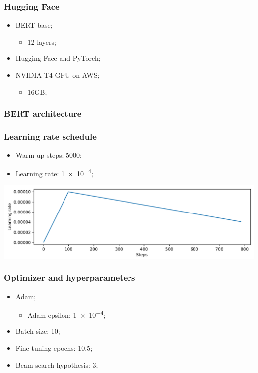 \documentclass{beamer}
\begin{document}
\begin{frame}
  \frametitle{Hugging Face}

  \begin{itemize}
    \item BERT base;
          \begin{itemize}
            \item 12 layers;
          \end{itemize}
    \item Hugging Face and PyTorch;
    \item NVIDIA T4 GPU on AWS;
          \begin{itemize}
            \item 16GB;
          \end{itemize}
  \end{itemize}
\end{frame}

\begin{frame}
  \frametitle{BERT architecture}

\end{frame}

\begin{frame}
  \frametitle{Learning rate schedule}

  \begin{itemize}
    \item Warm-up steps: \num{5000};
    \item Learning rate: \num{1e-4};
  \end{itemize}

  \bigbreak
  \bigbreak

  \includegraphics[width=\textwidth]{../images/warmup_linear_schedule.pdf}
\end{frame}

\begin{frame}
  \frametitle{Optimizer and hyperparameters}

  \begin{itemize}
    \item Adam;
          \begin{itemize}
            \item Adam epsilon: \num{1e-4};
          \end{itemize}
    \item Batch size: \num{10};
    \item Fine-tuning epochs: \num{10.5};
    \item Beam search hypothesis: \num{3};
  \end{itemize}
\end{frame}
\end{document}
